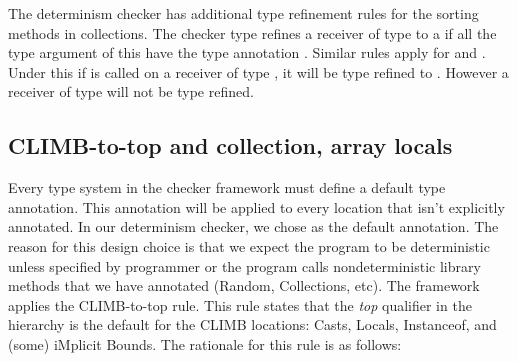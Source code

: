 The determinism checker has additional type refinement rules for the sorting methods in collections. 
The checker type refines a receiver of type  to a  if all the
type argument of this  have the type annotation . Similar rules apply for  and
.
Under this if  is called on a receiver of type , it will
be type refined to . However a receiver of type  will not be type refined.

\subsection{CLIMB-to-top and collection, array locals}\label{climb-rules}

Every type system in the checker framework must define a default type annotation. This annotation will be applied
to every location that isn't explicitly annotated. In our determinism checker, we chose  as the default annotation.
The reason for this design choice is that we expect the program to be 
deterministic unless specified by programmer or the program calls nondeterministic library methods that we have annotated 
(Random, Collections, etc).
The framework applies the CLIMB-to-top rule. This rule states that the \textit{top} qualifier 
in the hierarchy is the default for the CLIMB locations: Casts, Locals, Instanceof, and (some) iMplicit Bounds. The rationale
for this rule is as follows:

